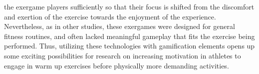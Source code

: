 the exergame players sufficiently so that their focus is shifted from the discomfort and exertion of the exercise towards the enjoyment of the experience. Nevertheless, as in other studies, these exergames were designed for general fitness routines, and often lacked meaningful gameplay that fits the exercise being performed.  Thus, utilizing these technologies with gamification elements opens up some exciting possibilities for research on increasing motivation in athletes to  engage in warm up exercises before physically more demanding activities. 

